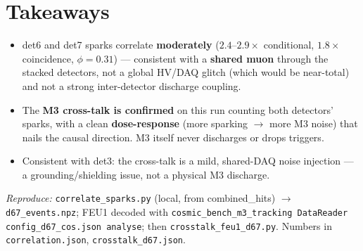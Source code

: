 \documentclass[11pt]{article}
\begin{document}
\section{Takeaways}
\begin{itemize}\setlength\itemsep{0.15em}
  \item det6 and det7 sparks correlate \textbf{moderately} ($2.4$--$2.9\times$ conditional,
        $1.8\times$ coincidence, $\phi=0.31$) --- consistent with a \textbf{shared muon}
        through the stacked detectors, not a global HV/DAQ glitch (which would be near-total)
        and not a strong inter-detector discharge coupling.
  \item The \textbf{M3 cross-talk is confirmed} on this run counting both detectors'
        sparks, with a clean \textbf{dose-response} (more sparking $\to$ more M3 noise) that
        nails the causal direction. M3 itself never discharges or drops triggers.
  \item Consistent with det3: the cross-talk is a mild, shared-DAQ noise injection ---
        a grounding/shielding issue, not a physical M3 discharge.
\end{itemize}

\vspace{0.4em}
\footnotesize\noindent\textit{Reproduce:} \texttt{correlate\_sparks.py} (local, from
combined\_hits) $\to$ \texttt{d67\_events.npz}; FEU1 decoded with
\texttt{cosmic\_bench\_m3\_tracking DataReader config\_d67\_cos.json analyse}; then
\texttt{crosstalk\_feu1\_d67.py}. Numbers in \texttt{correlation.json},
\texttt{crosstalk\_d67.json}.
\end{document}
